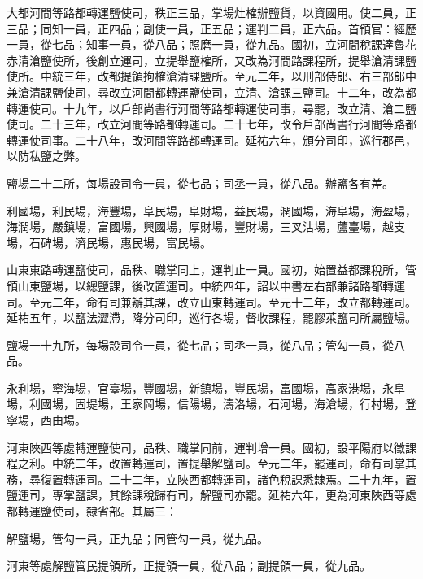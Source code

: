 \begin{pinyinscope}
 大都河間等路都轉運鹽使司，秩正三品，掌場灶榷辦鹽貨，以資國用。使二員，正三品；同知一員，正四品；副使一員，正五品；運判二員，正六品。首領官：經歷一員，從七品；知事一員，從八品；照磨一員，從九品。國初，立河間稅課達魯花赤清滄鹽使所，後創立運司，立提舉鹽榷所，又改為河間路課程所，提舉滄清課鹽使所。中統三年，改都提領拘榷滄清課鹽所。至元二年，以刑部侍郎、右三部郎中兼滄清課鹽使司，尋改立河間都轉運鹽使司，立清、滄課三鹽司。十二年，改為都轉運使司。十九年，以戶部尚書行河間等路都轉運使司事，尋罷，改立清、滄二鹽使司。二十三年，改立河間等路都轉運司。二十七年，改令戶部尚書行河間等路都轉運使司事。二十八年，改河間等路都轉運司。延祐六年，頒分司印，巡行郡邑，以防私鹽之弊。



 鹽場二十二所，每場設司令一員，從七品；司丞一員，從八品。辦鹽各有差。



 利國場，利民場，海豐場，阜民場，阜財場，益民場，潤國場，海阜場，海盈場，海潤場，嚴鎮場，富國場，興國場，厚財場，豐財場，三叉沽場，蘆臺場，越支場，石碑場，濟民場，惠民場，富民場。



 山東東路轉運鹽使司，品秩、職掌同上，運判止一員。國初，始置益都課稅所，管領山東鹽場，以總鹽課，後改置運司。中統四年，詔以中書左右部兼諸路都轉運司。至元二年，命有司兼辦其課，改立山東轉運司。至元十二年，改立都轉運司。延祐五年，以鹽法澀滯，降分司印，巡行各場，督收課程，罷膠萊鹽司所屬鹽場。



 鹽場一十九所，每場設司令一員，從七品；司丞一員，從八品；管勾一員，從八品。



 永利場，寧海場，官臺場，豐國場，新鎮場，豐民場，富國場，高家港場，永阜場，利國場，固堤場，王家岡場，信陽場，濤洛場，石河場，海滄場，行村場，登寧場，西由場。



 河東陜西等處轉運鹽使司，品秩、職掌同前，運判增一員。國初，設平陽府以徵課程之利。中統二年，改置轉運司，置提舉解鹽司。至元二年，罷運司，命有司掌其務，尋復置轉運司。二十二年，立陜西都轉運司，諸色稅課悉隸焉。二十九年，置鹽運司，專掌鹽課，其餘課稅歸有司，解鹽司亦罷。延祐六年，更為河東陜西等處都轉運鹽使司，隸省部。其屬三：



 解鹽場，管勾一員，正九品；同管勾一員，從九品。



 河東等處解鹽管民提領所，正提領一員，從八品；副提領一員，從九品。




\end{pinyinscope}
